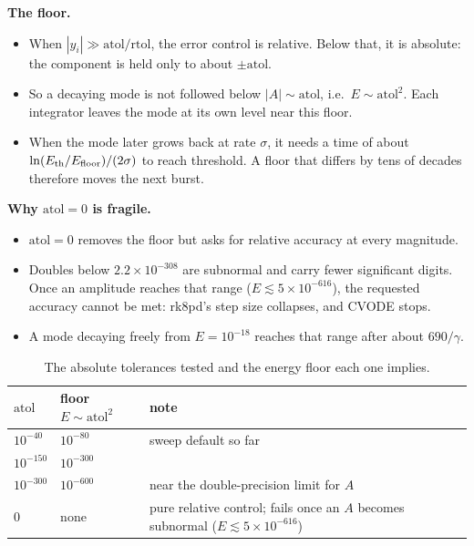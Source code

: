 \documentclass[10pt,a4paper]{article}
\newcommand{\atol}{\mathrm{atol}}
\newcommand{\rtol}{\mathrm{rtol}}
\newcommand{\Eth}{E_{\rm th}}
\begin{document}
\textbf{The floor.}
\begin{itemize}
    \item When $|y_i|\gg\atol/\rtol$, the error control is relative. Below that, it is absolute: the component is held only to about $\pm\atol$.
    \item So a decaying mode is not followed below $|A|\sim\atol$, i.e.\ $E\sim\atol^2$. Each integrator leaves the mode at its own level near this floor.
    \item When the mode later grows back at rate $\sigma$, it needs a time of about $\ln(\Eth/E_{\rm floor})/(2\sigma)$ to reach threshold. A floor that differs by tens of decades therefore moves the next burst.
\end{itemize}

\textbf{Why $\atol=0$ is fragile.}
\begin{itemize}
    \item $\atol=0$ removes the floor but asks for relative accuracy at every magnitude.
    \item Doubles below $2.2\times10^{-308}$ are subnormal and carry fewer significant digits. Once an amplitude reaches that range ($E\lesssim5\times10^{-616}$), the requested accuracy cannot be met: rk8pd's step size collapses, and CVODE stops.
    \item A mode decaying freely from $E=10^{-18}$ reaches that range after about $690/\gamma$.
\end{itemize}

\begin{table}[h]
    \centering\small
    \caption{The absolute tolerances tested and the energy floor each one implies.}
    \begin{tabular}{@{}lll@{}}
        \toprule
        $\atol$ & floor $E\sim\atol^2$ & note \\
        \midrule
        $10^{-40}$ & $10^{-80}$ & sweep default so far \\
        $10^{-150}$ & $10^{-300}$ & \\
        $10^{-300}$ & $10^{-600}$ & near the double-precision limit for $A$ \\
        $0$ & none & pure relative control; fails once an $A$ becomes subnormal ($E\lesssim5\times10^{-616}$) \\
        \bottomrule
    \end{tabular}
\end{table}
\end{document}
